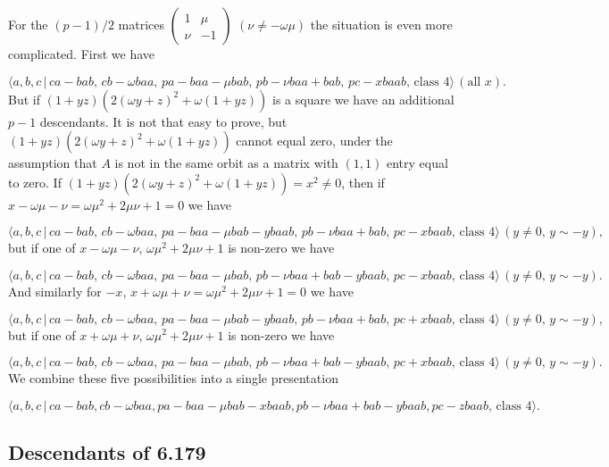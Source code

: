 \documentclass[10pt]{article}
\begin{document}
For the $(p-1)/2$ matrices $\left( 
\begin{array}{ll}
1 & \mu \\ 
\nu & -1%
\end{array}%
\right) $ $(\nu \neq -\omega \mu )$ the situation is even more complicated.
First we have

\[
\langle a,b,c\,|\,ca-bab,\,cb-\omega baa,\,pa-baa-\mu bab,\,pb-\nu
baa+bab,\,pc-xbaab,\,\text{class }4\rangle \,(\text{all }x). 
\]%
But if $\left( 1+yz\right) \left( 2\left( \omega y+z\right) ^{2}+\omega
(1+yz)\right) $ is a square we have an additional $p-1$ descendants. It is
not that easy to prove, but $\left( 1+yz\right) \left( 2\left( \omega
y+z\right) ^{2}+\omega (1+yz)\right) $ cannot equal zero, under the
assumption that $A$ is not in the same orbit as a matrix with $(1,1)$ entry
equal to zero. If $\left( 1+yz\right) \left( 2\left( \omega y+z\right)
^{2}+\omega (1+yz)\right) =x^{2}\neq 0$, then if $x-\omega \mu -\nu =\omega
\mu ^{2}+2\mu \nu +1=0$ we have

\[
\langle a,b,c\,|\,ca-bab,\,cb-\omega baa,\,pa-baa-\mu bab-ybaab,\,pb-\nu
baa+bab,\,pc-xbaab,\,\text{class }4\rangle \,(y\neq 0,\,y\sim -y), 
\]%
but if one of $x-\omega \mu -\nu $, $\omega \mu ^{2}+2\mu \nu +1$ is
non-zero we have

\[
\langle a,b,c\,|\,ca-bab,\,cb-\omega baa,\,pa-baa-\mu bab,\,pb-\nu
baa+bab-ybaab,\,pc-xbaab,\,\text{class }4\rangle \,(y\neq 0,\,y\sim -y). 
\]%
And similarly for $-x$, $x+\omega \mu +\nu =\omega \mu ^{2}+2\mu \nu +1=0$
we have

\[
\langle a,b,c\,|\,ca-bab,\,cb-\omega baa,\,pa-baa-\mu bab-ybaab,\,pb-\nu
baa+bab,\,pc+xbaab,\,\text{class }4\rangle \,(y\neq 0,\,y\sim -y), 
\]%
but if one of $x+\omega \mu +\nu $, $\omega \mu ^{2}+2\mu \nu +1$ is
non-zero we have

\[
\langle a,b,c\,|\,ca-bab,\,cb-\omega baa,\,pa-baa-\mu bab,\,pb-\nu
baa+bab-ybaab,\,pc+xbaab,\,\text{class }4\rangle \,(y\neq 0,\,y\sim -y). 
\]%
We combine these five possibilities into a single presentation

\begin{equation}
\langle a,b,c\,|\,ca-bab,cb-\omega baa,pa-baa-\mu bab-xbaab,pb-\nu
baa+bab-ybaab,pc-zbaab,\,\text{class }4\rangle .  \tag{7.1799}
\end{equation}

\subsection{Descendants of 6.179}
\end{document}
